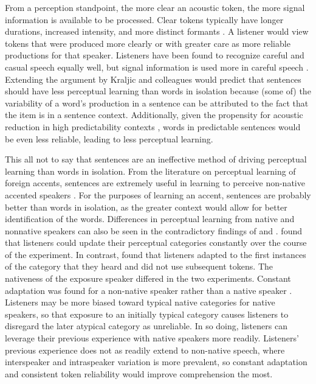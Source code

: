 From a perception standpoint, the more clear an acoustic token, the more signal information is available to be processed.
Clear tokens typically have longer durations, increased intensity, and more distinct formants \citep{Krause2004}.
A listener would view tokens that were produced more clearly or with greater care as more reliable productions for that speaker.
Listeners have been found to recognize careful and casual speech equally well, but signal information is used more in careful speech \citep{Sumner2015}.
Extending the argument by Kraljic and colleagues would predict that sentences should have less perceptual learning than words in isolation because (some of) the variability of a word's production in a sentence can be attributed to the fact that the item is in a sentence context.
Additionally, given the propensity for acoustic reduction in high predictability contexts \citep{Scarborough2010}, words in predictable sentences would be even less reliable, leading to less perceptual learning.

This all not to say that sentences are an ineffective method of driving perceptual learning than words in isolation.
From the literature on perceptual learning of foreign accents, sentences are extremely useful in learning to perceive non-native accented speakers \citep{Bradlow2008}.
For the purposes of learning an accent, sentences are probably better than words in isolation, as the greater context would allow for better identification of the words.
Differences in perceptual learning from native and nonnative speakers can also be seen in the contradictory findings of \citet{Sumner2011} and \citet{Kraljic2008}.
\citet{Sumner2011} found that listeners could update their perceptual categories constantly over the course of the experiment.
In contrast, \citet{Kraljic2008} found that listeners adapted to the first instances of the category that they heard and did not use subsequent tokens.
The nativeness of the exposure speaker differed in the two experiments.
Constant adaptation was found for a non-native speaker \citep{Sumner2011} rather than a native speaker \citep{Kraljic2008}.
Listeners may be more biased toward typical native categories for native speakers, so that exposure to an initially typical category causes listeners to disregard the later atypical category as unreliable.
In so doing, listeners can leverage their previous experience with native speakers more readily.
Listeners' previous experience does not as readily extend to non-native speech, where interspeaker and intraspeaker variation is more prevalent, so constant adaptation and consistent token reliability would improve comprehension the most.

